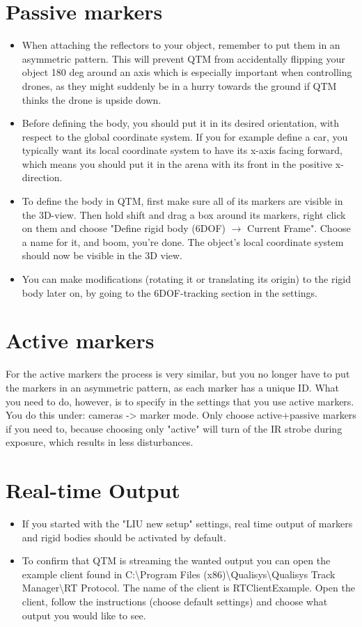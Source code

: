 \documentclass{article}
\begin{document}
\section{Passive markers}
\begin{itemize}
    \item When attaching the reflectors to your object, remember to put them in an asymmetric pattern. This will prevent QTM from accidentally flipping your object 180 deg around an axis which is especially important when controlling drones, as they might suddenly be in a hurry towards the ground if QTM thinks the drone is upside down.
    \item Before defining the body, you should put it in its desired orientation, with respect to the global coordinate system. If you for example define a car, you typically want its local coordinate system to have its x-axis facing forward, which means you should put it in the arena with its front in the positive x-direction.
    \item To define the body in QTM, first make sure all of its markers are visible in the 3D-view. Then hold shift and drag a box around its markers, right click on them and choose "Define rigid body (6DOF) $\rightarrow$ Current Frame". Choose a name for it, and boom, you're done. The object's local coordinate system should now be visible in the 3D view.
    \item You can make modifications (rotating it or translating its origin) to the rigid body later on, by going to the 6DOF-tracking section in the settings.
\end{itemize}
\section{Active markers}
    For the active markers the process is very similar, but you no longer have to put the markers in an asymmetric pattern, as each marker has a unique ID. What you need to do, however, is to specify in the settings that you use active markers. You do this under: cameras -> marker mode. Only choose active+passive markers if you need to, because choosing only "active" will turn of the IR strobe during exposure, which results in less disturbances.

\section{Real-time Output}
\begin{itemize}
    \item If you started with the "LIU new setup" settings, real time output of markers and rigid bodies should be activated by default.
    \item To confirm that QTM is streaming the wanted output you can open the example client found in C:\textbackslash Program Files (x86)\textbackslash Qualisys\textbackslash Qualisys Track Manager\textbackslash RT Protocol. The name of the client is RTClientExample. Open the client, follow the instructions (choose default settings) and choose what output you would like to see.
\end{itemize}
\end{document}
